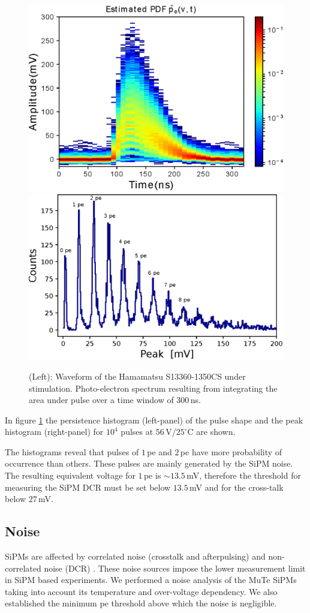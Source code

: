 \documentclass[a4paper,11pt]{article}
\begin{document}

\begin{figure}[htbp]
\centering %
\includegraphics[width=.48\textwidth]{Figures/PDF_1350CS.eps}
\includegraphics[width=.49\textwidth]{Figures/Peak_1350CS.eps}
\caption{\label{fig:peak} (Left): Waveform of the Hamamatsu S13360-1350CS under stimulation. Photo-electron spectrum resulting from integrating the area under pulse over a time window of $300$\,ns.}
\end{figure}

In figure \ref{fig:peak} the persistence histogram (left-panel) of the pulse shape and the peak histogram (right-panel) for $10^4$ pulses at $56$\,V/$25^{\circ}$C are shown.

The histograms reveal that pulses of $1$\,pe and $2$\,pe have more probability of occurrence than others. These pulses are mainly generated by the SiPM noise. The resulting equivalent voltage for $1$\,pe is $\sim13.5$\,mV, therefore the threshold for measuring the SiPM DCR must be set below $13.5$\,mV and for the cross-talk below $27$\,mV.

\subsection{Noise}

SiPMs are affected by correlated noise (crosstalk and afterpulsing) and non-correlated noise (DCR) \cite{Baudis2018}. These noise sources impose the lower measurement limit in SiPM based experiments. We performed a noise analysis of the MuTe SiPMs taking into account its temperature and over-voltage dependency. We also established the minimum pe threshold above which the noise is negligible.
\end{document}
